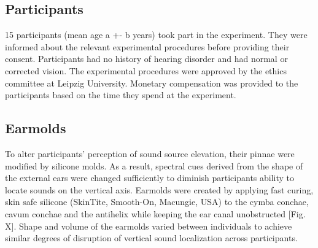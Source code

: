 \subsection{Participants}
15 participants (mean age a +- b years) took part in the experiment.
They were informed about the relevant experimental procedures before providing their consent. Participants had no history of hearing disorder and had normal or corrected vision. The experimental procedures were approved by the ethics committee at Leipzig University.  Monetary compensation was provided to the participants based on the time they spend at the experiment.

\subsection{Earmolds}
To alter participants’ perception of sound source elevation, their pinnae were modified by silicone molds. As a result, spectral cues derived from the shape of the external ears were changed sufficiently to diminish participants ability to locate sounds on the vertical axis. Earmolds were created by applying fast curing, skin safe silicone (SkinTite, Smooth-On, Macungie, USA) to the cymba conchae, cavum conchae and the antihelix while keeping the ear canal unobstructed [Fig. X]. Shape and volume of the earmolds varied between individuals to achieve similar degrees of disruption of vertical sound localization across participants.

